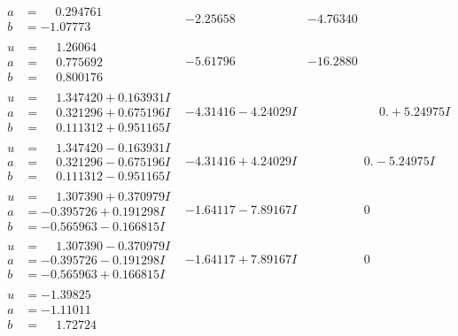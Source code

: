 \documentclass[1p]{elsarticle_modified}
\theoremstyle{definition}
\begin{document}
$$\begin{array}{c|c|c}
\begin{aligned}
a &= \phantom{-}0.294761\phantom{ +0.000000I} \\
b &= -1.07773\phantom{ +0.000000I}\end{aligned}
 & -2.25658\phantom{ +0.000000I} & -4.76340\phantom{ +0.000000I} \\ \hline\begin{aligned}
u &= \phantom{-}1.26064\phantom{ +0.000000I} \\
a &= \phantom{-}0.775692\phantom{ +0.000000I} \\
b &= \phantom{-}0.800176\phantom{ +0.000000I}\end{aligned}
 & -5.61796\phantom{ +0.000000I} & -16.2880\phantom{ +0.000000I} \\ \hline\begin{aligned}
u &= \phantom{-}1.347420 + 0.163931 I \\
a &= \phantom{-}0.321296 + 0.675196 I \\
b &= \phantom{-}0.111312 + 0.951165 I\end{aligned}
 & -4.31416 - 4.24029 I & \phantom{-0.000000 -}0. + 5.24975 I \\ \hline\begin{aligned}
u &= \phantom{-}1.347420 - 0.163931 I \\
a &= \phantom{-}0.321296 - 0.675196 I \\
b &= \phantom{-}0.111312 - 0.951165 I\end{aligned}
 & -4.31416 + 4.24029 I & \phantom{-0.000000 } 0. - 5.24975 I \\ \hline\begin{aligned}
u &= \phantom{-}1.307390 + 0.370979 I \\
a &= -0.395726 + 0.191298 I \\
b &= -0.565963 - 0.166815 I\end{aligned}
 & -1.64117 - 7.89167 I & \phantom{-0.000000 } 0 \\ \hline\begin{aligned}
u &= \phantom{-}1.307390 - 0.370979 I \\
a &= -0.395726 - 0.191298 I \\
b &= -0.565963 + 0.166815 I\end{aligned}
 & -1.64117 + 7.89167 I & \phantom{-0.000000 } 0 \\ \hline\begin{aligned}
u &= -1.39825\phantom{ +0.000000I} \\
a &= -1.11011\phantom{ +0.000000I} \\
b &= \phantom{-}1.72724\phantom{ +0.000000I}\end{aligned}

\end{array}$$
\end{document}
